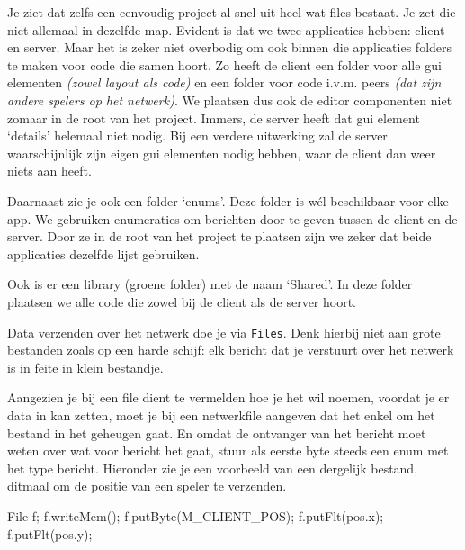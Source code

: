Je ziet dat zelfs een eenvoudig project al snel uit heel wat files bestaat. Je zet die niet allemaal in dezelfde map. Evident is dat we twee applicaties hebben: client en server. Maar het is zeker niet overbodig om ook binnen die applicaties folders te maken voor code die samen hoort. Zo heeft de client een folder voor alle gui elementen \textit{(zowel layout als code)} en een folder voor code i.v.m. peers \textit{(dat zijn andere spelers op het netwerk)}. We plaatsen dus ook de editor componenten niet zomaar in de root van het project. Immers, de server heeft dat gui element `details' helemaal niet nodig. Bij een verdere uitwerking zal de server waarschijnlijk zijn eigen gui elementen nodig hebben, waar de client dan weer niets aan heeft.

Daarnaast zie je ook een folder `enums'. Deze folder is w\'el beschikbaar voor elke app. We gebruiken enumeraties om berichten door te geven tussen de client en de server. Door ze in de root van het project te plaatsen zijn we zeker dat beide applicaties dezelfde lijst gebruiken.

Ook is er een library (groene folder) met de naam `Shared'. In deze folder plaatsen we alle code die zowel bij de client als de server hoort.

\begin{note}
Data verzenden over het netwerk doe je via \texttt{Files}. Denk hierbij niet aan grote bestanden zoals op een harde schijf: elk bericht dat je verstuurt over het netwerk is in feite in klein bestandje. 

Aangezien je bij een file dient te vermelden hoe je het wil noemen, voordat je er data in kan zetten, moet je bij een netwerkfile aangeven dat het enkel om het bestand in het geheugen gaat. En omdat de ontvanger van het bericht moet weten over wat voor bericht het gaat, stuur als eerste byte steeds een enum met het type bericht. Hieronder zie je een voorbeeld van een dergelijk bestand, ditmaal om de positie van een speler te verzenden.

\begin{code}
File f;
f.writeMem();
f.putByte(M_CLIENT_POS);
f.putFlt(pos.x);
f.putFlt(pos.y);
\end{code}
\end{note}
